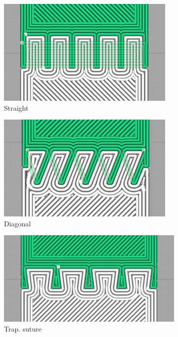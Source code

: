 \begin{figure}
	\setlength{\figheight}{.42\columnwidth}
	\centering
	\begin{subfigure}[B]{.26\columnwidth}
		\centering
		\includegraphics[width=\figheight,rotate=90]{sources/testing/straight_gcode.jpg}
		\caption{Straight}
		\label{fig:gcode_straight}
	\end{subfigure}
	\begin{subfigure}[B]{.26\columnwidth}
		\centering
		\includegraphics[width=\figheight,rotate=90]{sources/testing/diagonal_gcode.jpg}
		\caption{Diagonal}
		\label{fig:gcode_diagonal}
	\end{subfigure}
	\begin{subfigure}[B]{.22\columnwidth}
		\centering
		\includegraphics[width=\figheight,rotate=90]{sources/testing/suture_gcode.jpg}
		\caption{Trap. suture}
		\label{fig:gcode_suture}
	\end{subfigure}
	\begin{subfigure}[B]{.22\columnwidth}

\end{subfigure}
\end{figure}
